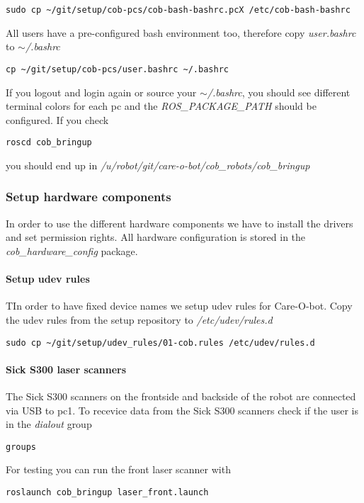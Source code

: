 \begin{lstlisting}
sudo cp ~/git/setup/cob-pcs/cob-bash-bashrc.pcX /etc/cob-bash-bashrc
\end{lstlisting}

All users have a pre-configured bash environment too, therefore copy \textit{user.bashrc} to \textit{$\sim$/.bashrc}
\begin{lstlisting}
cp ~/git/setup/cob-pcs/user.bashrc ~/.bashrc
\end{lstlisting}

If you logout and login again or source your \textit{$\sim$/.bashrc}, you should see different terminal colors for each pc and the \textit{ROS\_PACKAGE\_PATH} should be configured. If you check 
\begin{lstlisting}
roscd cob_bringup
\end{lstlisting}
you should end up in \textit{/u/robot/git/care-o-bot/cob\_robots/cob\_bringup}

\subsubsection{Setup hardware components}
In order to use the different hardware components we have to install the drivers and set permission rights. All hardware configuration is stored in the \textit{cob\_hardware\_config} package.

\paragraph{Setup udev rules}
TIn order to have fixed device names we setup udev rules for Care-O-bot. Copy the udev rules from the setup repository to \textit{/etc/udev/rules.d}
\begin{lstlisting}
sudo cp ~/git/setup/udev_rules/01-cob.rules /etc/udev/rules.d
\end{lstlisting}

\paragraph{Sick S300 laser scanners}
The Sick S300 scanners on the frontside and backside of the robot are connected via USB to pc1. To recevice data from the Sick S300 scanners check if the user is in the \textit{dialout} group
\begin{lstlisting}
groups
\end{lstlisting}

For testing you can run the front laser scanner with
\begin{lstlisting}
roslaunch cob_bringup laser_front.launch
\end{lstlisting}

